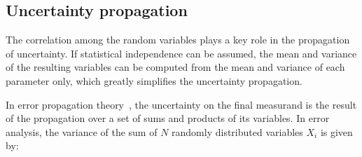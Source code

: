 \subsection{Uncertainty propagation}
\label{method_unc_prop}

The correlation among the random variables plays a key role in the propagation of uncertainty. If statistical independence can be assumed, the mean and variance of the resulting variables can be computed from the mean and variance of each parameter only, which greatly simplifies the uncertainty propagation.

In error propagation theory~\cite{jcgm_evaluation_2008, goodman_variance_1962}, the uncertainty on the final measurand is the result of the propagation over a set of sums and products of its variables. In error analysis, the variance of the sum of $N$ randomly distributed variables $X_i$ is given by:

